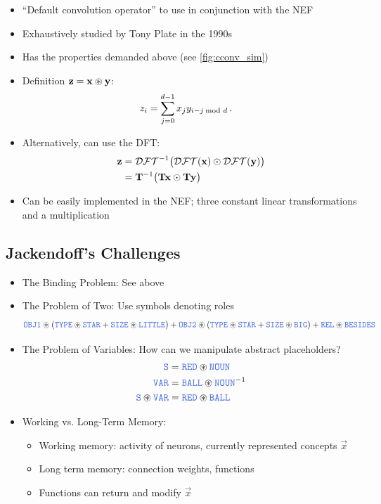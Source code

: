 \documentclass[10pt,letterpaper,oneside]{article}
\begin{document}
\begin{itemize}
	\item \enquote{Default convolution operator} to use in conjunction with the NEF
	\item Exhaustively studied by Tony Plate in the 1990s \cite{plate1995holographic}
	\item Has the properties demanded above (see \cref{fig:cconv_sim})
	\item Definition ${\mathbf{z}} = {\mathbf{x}} \circledast {\mathbf{y}}$:
	\begin{align*}
		z_i &= \sum_{j = 0}^{d - 1} x_{j} y_{i - j \hspace{-1.25mm} \mod d } \,.
	\end{align*}
	\item Alternatively, can use the DFT:
	\begin{align*}
		{\mathbf{z}} &= \mathcal{DFT}^{-1} \big( \mathcal{DFT}({\mathbf{x}}) \odot \mathcal{DFT}({\mathbf{y}}) \big) \\
		       &= {\mathbf{T}}^{-1} \big( {\mathbf{T}} {\mathbf{x}} \odot {\mathbf{T}} {\mathbf{y}} \big)
	\end{align*}
	\item Can be easily implemented in the NEF; three constant linear transformations and a multiplication
\end{itemize}

\subsection{Jackendoff's Challenges}

\begin{itemize}
	\item The Binding Problem: See above
	\item The Problem of Two: Use symbols denoting roles
	\begin{align*}
		\Obj{OBJ1} \CC (\Obj{TYPE} \CC \Obj{STAR} + \Obj{SIZE} \CC \Obj{LITTLE}) + \Obj{OBJ2} \CC (\Obj{TYPE} \CC \Obj{STAR} + \Obj{SIZE} \CC \Obj{BIG}) + \Obj{REL} \CC \Obj{BESIDES}
	\end{align*}
	\item The Problem of Variables: How can we manipulate abstract placeholders?
	\begin{align*}
		 \Obj{S} &= \Obj{RED} \CC \Obj{NOUN}
\\
		 \Obj{VAR} &= \Obj{BALL} \CC \Obj{NOUN}^{-1} \\
		 \Obj{S} \CC \Obj{VAR} &= \Obj{RED} \CC \Obj{BALL}
	\end{align*}
	\item Working vs. Long-Term Memory:
	\begin{itemize}
		\item Working memory: activity of neurons, currently represented concepts $\vec x$
		\item Long term memory: connection weights, functions
		\item Functions can return and modify $\vec x$
	\end{itemize}
\end{itemize}
\end{document}
